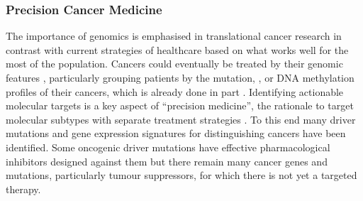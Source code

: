\subsubsection{Precision Cancer Medicine}

The importance of genomics is emphasised in translational cancer research in contrast with current strategies of healthcare based on what works well for the most of the population.
Cancers could eventually be treated by their genomic features \citep{Roychowdhury2016}, particularly grouping patients by the \gls{mutation}, , or \acrshort{DNA} methylation profiles of their cancers, which is already done in part \citep{Parker2009}. 
Identifying actionable molecular targets is a key aspect of ``\gls{precision medicine}'', the rationale to target \glspl{molecular subtype} with separate treatment strategies \citep{Glaire2017}. To this end many \glspl{driver mutation} and \gls{gene expression} signatures for distinguishing cancers have been identified. Some oncogenic \glspl{driver mutation} have effective pharmacological inhibitors designed against them but there remain many \glspl{cancer gene} and \glspl{mutation}, particularly \glspl{tumour suppressor}, for which there is not yet a \gls{targeted therapy}.

